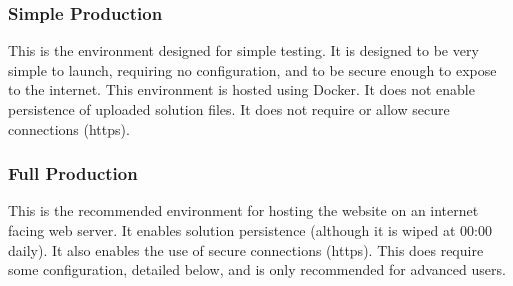 \subsubsection{Simple Production}

This is the environment designed for simple testing.  It is designed to be very simple to launch, requiring no configuration, and to be secure enough to expose to the internet.  This environment is hosted using Docker.  It does not enable persistence of uploaded solution files.  It does not require or allow secure connections (https).

\subsubsection{Full Production}

This is the recommended environment for hosting the website on an internet facing web server.  It enables solution persistence (although it is wiped at 00:00 daily).  It also enables the use of secure connections (https).  This does require some configuration, detailed below, and is only recommended for advanced users.